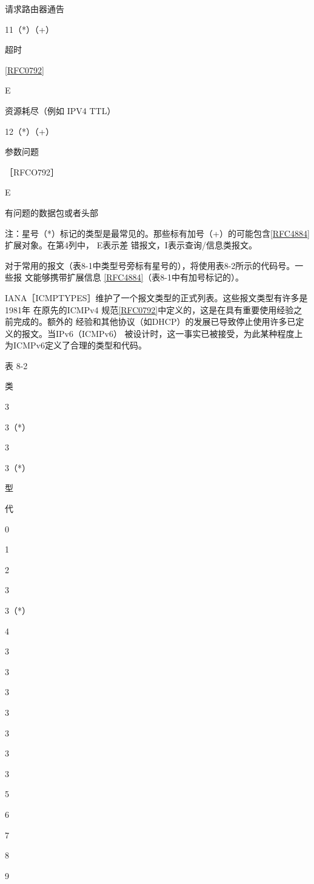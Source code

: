 请求路由器通告

11（*）（+）

超时

\href{https://www.rfc-editor.org/rfc/rfc0792}{[RFC0792]}

E

资源耗尽（例如 IPV4 TTL）

12（*）（+）

参数问题

［RFCO792］

E

有问题的数据包或者头部

注：星号（*）标记的类型是最常见的。那些标有加号（+）的可能包含\href{https://www.rfc-editor.org/rfc/rfc4884}{[RFC4884]} 扩展对象。在第4列中，
E表示差 错报文，I表示查询/信息类报文。

对于常用的报文（表8-1中类型号旁标有星号的），将使用表8-2所示的代码号。一些报
文能够携带扩展信息 \href{https://www.rfc-editor.org/rfc/rfc4884}{[RFC4884]}（表8-1中有加号标记的）。

IANA［ICMPTYPES］维护了一个报文类型的正式列表。这些报文类型有许多是1981年
在原先的ICMPv4 规范\href{https://www.rfc-editor.org/rfc/rfc0792}{[RFC0792]}中定义的，这是在具有重要使用经验之前完成的。额外的
经验和其他协议（如DHCP）的发展已导致停止使用许多已定义的报文。当IPv6（ICMPv6）
被设计时，这一事实已被接受，为此某种程度上为ICMPv6定义了合理的类型和代码。

表 8-2

类

3

3（*）

3

3（*）

型

代

0

1

2

3

3（*）

4

3

3

3

3

3

3

3

5

6

7

8

9

